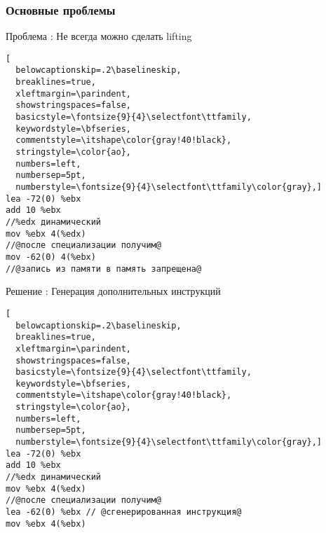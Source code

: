 \documentclass[demo]{beamer}
\begin{document}
\lstset{language=C}
\begin{frame}[fragile]\frametitle{Основные проблемы}
Проблема : Не всегда можно сделать lifting \\
\begin{lstlisting}[
  belowcaptionskip=.2\baselineskip,
  breaklines=true,
  xleftmargin=\parindent,
  showstringspaces=false,
  basicstyle=\fontsize{9}{4}\selectfont\ttfamily,
  keywordstyle=\bfseries,
  commentstyle=\itshape\color{gray!40!black},
  stringstyle=\color{ao},
  numbers=left,
  numbersep=5pt,
  numberstyle=\fontsize{9}{4}\selectfont\ttfamily\color{gray},]
lea -72(0) %ebx
add 10 %ebx
//%edx динамический
mov %ebx 4(%edx)
//@после специализации получим@
mov -62(0) 4(%ebx)
//@запись из памяти в память запрещена@
\end{lstlisting}
\vfill
Решение : Генерация дополнительных инструкций
\begin{lstlisting}[
  belowcaptionskip=.2\baselineskip,
  breaklines=true,
  xleftmargin=\parindent,
  showstringspaces=false,
  basicstyle=\fontsize{9}{4}\selectfont\ttfamily,
  keywordstyle=\bfseries,
  commentstyle=\itshape\color{gray!40!black},
  stringstyle=\color{ao},
  numbers=left,
  numbersep=5pt,
  numberstyle=\fontsize{9}{4}\selectfont\ttfamily\color{gray},]
lea -72(0) %ebx
add 10 %ebx
//%edx динамический
mov %ebx 4(%edx)
//@после специализации получим@
lea -62(0) %ebx // @сгенерированная инструкция@
mov %ebx 4(%ebx)
\end{lstlisting}
\end{frame}
\end{document}
